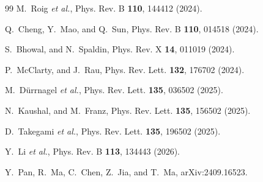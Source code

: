 \documentclass[aps,prb,reprint,superscriptaddress,amsmath,amssymb,floatfix]{revtex4-2}
\begin{document}
\begin{thebibliography}{99}
M.~Roig \textit{et al.},
Phys. Rev. B \textbf{110}, 144412 (2024).

Q.~Cheng, Y.~Mao, and Q.~Sun,
Phys. Rev. B \textbf{110}, 014518 (2024).

S.~Bhowal, and N.~Spaldin,
Phys. Rev. X \textbf{14}, 011019 (2024).

P.~McClarty, and J.~Rau,
Phys. Rev. Lett. \textbf{132}, 176702 (2024).

M.~Dürrnagel \textit{et al.},
Phys. Rev. Lett. \textbf{135}, 036502 (2025).

N.~Kaushal, and M.~Franz,
Phys. Rev. Lett. \textbf{135}, 156502 (2025).

D.~Takegami \textit{et al.},
Phys. Rev. Lett. \textbf{135}, 196502 (2025).

Y.~Li \textit{et al.},
Phys. Rev. B \textbf{113}, 134443 (2026).

Y.~Pan, R.~Ma, C.~Chen, Z.~Jia, and T.~Ma,
arXiv:2409.16523.

\end{thebibliography}
\end{document}
